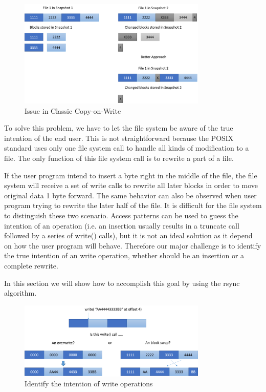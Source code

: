 \begin{figure}[hbtp]
\centering
\includegraphics[width=0.8\textwidth]{Chapter-4/figs/fig5.png}
\caption{Issue in Classic Copy-on-Write}
\label{fig:issue_classic_cow}
\end{figure}
 
    To solve this problem, we have to let the file system be aware of the true intention of the end user. This is not straightforward because the POSIX standard uses only one file system call to handle all kinds of modification to a file. The only function of this file system call is to rewrite a part of a file.
    
    If the user program intend to insert a byte right in the middle of the file, the file system will receive a set of write calls to rewrite all later blocks in order to move original data 1 byte forward. The same behavior can also be observed when user program trying to rewrite the later half of the file. It is difficult for the file system to distinguish these two scenario. Access patterns can be used to guess the intention of an operation (i.e. an insertion usually results in a truncate call followed by a series of write() calls), but it is not an ideal solution as it depend on how the user program will behave. Therefore our major challenge is to identify the true intention of an write operation, whether should be an insertion or a complete rewrite.

    In this section we will show how to accomplish this goal by using the rsync algorithm.

\begin{figure}[hbtp]
\centering
\includegraphics[width=0.8\textwidth]{Chapter-4/figs/fig6.png}
\caption{Identify the intention of write operations}
\label{fig:write_intention}
\end{figure}

